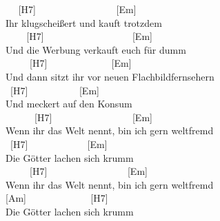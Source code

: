 \documentclass[
  letterpaper,
  twoside=false]{scrbook}
\begin{document}
~ ~{[}H7{]} ~ ~ ~ ~ ~ ~ ~ ~ ~ ~{[}Em{]}\\
Ihr klugscheißert und kauft trotzdem\\
\hspace*{0.333em} ~ ~ ~{[}H7{]} ~ ~ ~ ~ ~ ~ ~ ~ ~ ~ ~{[}Em{]}\\
Und die Werbung verkauft euch für dumm\\
\hspace*{0.333em} ~ ~ ~ {[}H7{]} ~ ~ ~ ~ ~ ~ ~ ~{[}Em{]}\\
Und dann sitzt ihr vor neuen Flachbildfernsehern\\
\hspace*{0.333em} ~{[}H7{]} ~ ~ ~ ~ ~ ~ {[}Em{]}\\
Und meckert auf den Konsum\\
\hspace*{0.333em} ~ ~ ~ ~{[}H7{]} ~ ~ ~ ~ ~ ~ ~ ~ ~ ~{[}Em{]} ~\\
Wenn ihr das Welt nennt, bin ich gern weltfremd\\
\hspace*{0.333em} ~{[}H7{]} ~ ~ ~ ~ ~ ~ ~ {[}Em{]}\\
Die Götter lachen sich krumm\\
\hspace*{0.333em} ~ ~ ~ {[}H7{]} ~ ~ ~ ~ ~ ~ ~ ~ ~ ~{[}Em{]}\\
Wenn ihr das Welt nennt, bin ich gern weltfremd\\
\hspace*{0.333em} {[}Am{]} ~ ~ ~ ~ ~ ~ ~ ~{[}H7{]}\\
Die Götter lachen sich krumm
\end{document}
